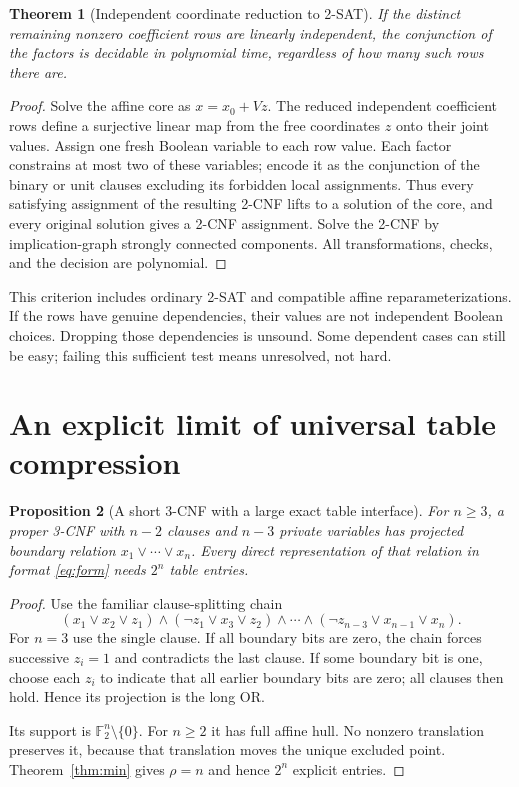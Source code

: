 \documentclass[11pt]{article}
\newtheorem{theorem}{Theorem}
\newtheorem{proposition}[theorem]{Proposition}
\newcommand{\F}{\mathbb F_2}
\begin{document}
\begin{theorem}[Independent coordinate reduction to 2-SAT]\label{thm:2sat}
If the distinct remaining nonzero coefficient rows are linearly independent, the
conjunction of the factors is decidable in polynomial time, regardless of how many
such rows there are.
\end{theorem}
\begin{proof}
Solve the affine core as $x=x_0+Vz$. The reduced independent coefficient rows define
a surjective linear map from the free coordinates $z$ onto their joint values.
Assign one fresh Boolean variable to each row value. Each factor constrains at most
two of these variables; encode it as the conjunction of the binary or unit clauses
excluding its forbidden local assignments. Thus every satisfying assignment of the
resulting 2-CNF lifts to a solution of the core, and every original solution gives
a 2-CNF assignment. Solve the 2-CNF by implication-graph strongly connected
components. All transformations, checks, and the decision are polynomial.
\end{proof}

This criterion includes ordinary 2-SAT and compatible affine reparameterizations.
If the rows have genuine dependencies, their values are not independent Boolean
choices. Dropping those dependencies is unsound. Some dependent cases can still be
easy; failing this sufficient test means unresolved, not hard.

\section{An explicit limit of universal table compression}
\begin{proposition}[A short 3-CNF with a large exact table interface]\label{prop:or}
For $n\ge3$, a proper 3-CNF with $n-2$ clauses and $n-3$ private variables has projected
boundary relation $x_1\lor\cdots\lor x_n$. Every direct representation of that
relation in format \eqref{eq:form} needs $2^n$ table entries.
\end{proposition}
\begin{proof}
Use the familiar clause-splitting chain
\[
 (x_1\lor x_2\lor z_1)\land
 (\neg z_1\lor x_3\lor z_2)\land\cdots\land
 (\neg z_{n-3}\lor x_{n-1}\lor x_n).
\]
For $n=3$ use the single clause. If all boundary bits are zero, the chain forces
successive $z_i=1$ and contradicts the last clause. If some boundary bit is one,
choose each $z_i$ to indicate that all earlier boundary bits are zero; all clauses
then hold. Hence its projection is the long OR.

Its support is $\F^n\setminus\{0\}$. For $n\ge2$ it has full affine hull. No nonzero
translation preserves it, because that translation moves the unique excluded point.
Theorem~\ref{thm:min} gives $\rho=n$ and hence $2^n$ explicit entries.
\end{proof}
\end{document}
